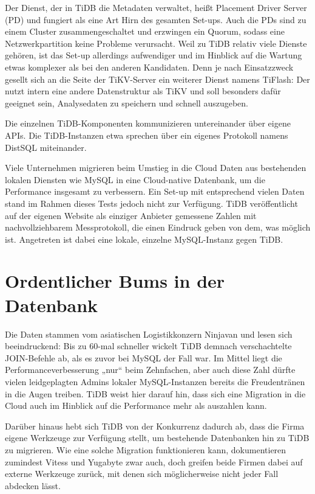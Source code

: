 Der Dienst, der in TiDB die Metadaten verwaltet, heißt Placement Driver Server (PD) und fungiert als eine Art Hirn des gesamten Set-ups. Auch die PDs sind zu einem Cluster zusammengeschaltet und erzwingen ein Quorum, sodass eine Netzwerkpartition keine Probleme verursacht. Weil zu TiDB relativ viele Dienste gehören, ist das Set-up allerdings aufwendiger und im Hinblick auf die Wartung etwas komplexer als bei den anderen Kandidaten. Denn je nach Einsatzzweck gesellt sich an die Seite der TiKV-Server ein weiterer Dienst namens TiFlash: Der nutzt intern eine andere Datenstruktur als TiKV und soll besonders dafür geeignet sein, Analysedaten zu speichern und schnell auszugeben.

Die einzelnen TiDB-Komponenten kommunizieren untereinander über eigene APIs. Die TiDB-Instanzen etwa sprechen über ein eigenes Protokoll namens DistSQL miteinander.

Viele Unternehmen migrieren beim Umstieg in die Cloud Daten aus bestehenden lokalen Diensten wie MySQL in eine Cloud-native Datenbank, um die Performance insgesamt zu verbessern. Ein Set-up mit entsprechend vielen Daten stand im Rahmen dieses Tests jedoch nicht zur Verfügung. TiDB veröffentlicht auf der eigenen Website als einziger Anbieter gemessene Zahlen mit nachvollziehbarem Messprotokoll, die einen Eindruck geben von dem, was möglich ist. Angetreten ist dabei eine lokale, einzelne MySQL-Instanz gegen TiDB.

\section{Ordentlicher Bums in der Datenbank}

Die Daten stammen vom asiatischen Logistikkonzern Ninjavan und lesen sich beeindruckend: Bis zu 60-mal schneller wickelt TiDB demnach verschachtelte JOIN-Befehle ab, als es zuvor bei MySQL der Fall war. Im Mittel liegt die Performanceverbesserung „nur“ beim Zehnfachen, aber auch diese Zahl dürfte vielen leidgeplagten Admins lokaler MySQL-Instanzen bereits die Freudentränen in die Augen treiben. TiDB weist hier darauf hin, dass sich eine Migration in die Cloud auch im Hinblick auf die Performance mehr als auszahlen kann.

Darüber hinaus hebt sich TiDB von der Konkurrenz dadurch ab, dass die Firma eigene Werkzeuge zur Verfügung stellt, um bestehende Datenbanken hin zu TiDB zu migrieren. Wie eine solche Migration funktionieren kann, dokumentieren zumindest Vitess und Yugabyte zwar auch, doch greifen beide Firmen dabei auf externe Werkzeuge zurück, mit denen sich möglicherweise nicht jeder Fall abdecken lässt.

